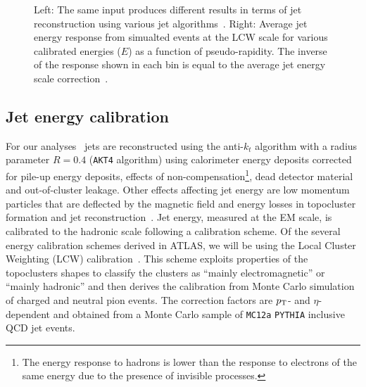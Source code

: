 \begin{figure}[tb]\begin{center}
        \caption{Left: The same input produces different results in terms of jet reconstruction using 
        various jet algorithms~\cite{Salam:2009jx}. Right: Average jet energy response from simualted events
        at the LCW scale for various calibrated energies ($E$) as a function of
        pseudo-rapidity. The inverse of the response shown 
        in each bin is equal to the average jet energy scale correction~\cite{jes}.}
\end{center}\end{figure}


\tocless\subsection{Jet energy calibration}
For our analyses~\cite{topcommon2013} jets are 
reconstructed using the anti-$k_t$
algorithm with a radius parameter $R=0.4$ 
(\texttt{AKT4} algorithm) 
using calorimeter energy deposits corrected for 
pile-up energy deposits, effects 
of non-compensation\footnote{The energy response 
to hadrons is lower than the response to electrons of the 
same energy due to the presence of invisible processes.},
dead detector material and out-of-cluster leakage.
Other effects affecting jet energy are low momentum particles
that are deflected by the magnetic field and energy losses in 
topocluster formation and jet reconstruction~\cite{jes}. 
Jet energy, measured at the EM scale,
is calibrated to the hadronic scale following 
a calibration scheme.
Of the several energy calibration schemes 
derived in ATLAS, we will be using the 
Local Cluster Weighting (LCW) calibration~\cite{LCW1,LCW2}.
This scheme exploits properties of the topoclusters shapes 
to classify the clusters as ``mainly electromagnetic'' or
``mainly hadronic'' and then derives the calibration from 
Monte Carlo simulation of charged and neutral pion events. 
The correction factors are $\pt$- and $\eta$-dependent
and obtained from a Monte Carlo sample of \texttt{MC12a}
\texttt{PYTHIA} inclusive QCD jet events.

